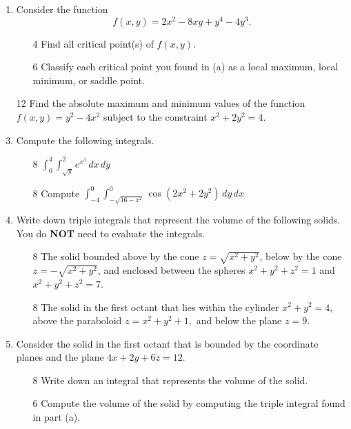 \documentclass[addpoints,12pt]{exam}
\begin{document}
\begin{enumerate}
\newpage
\item Consider the function
$$f(x,y) = 2x^2 -8xy +y^4 -4y^3.$$
%
%
\begin{itemize}
\item[4]
Find all critical point(s) of $f(x,y)$.
\vfill
\vfill
\item[6]
Classify each critical point you found in (a) as a local maximum, local minimum, or saddle point.
\vfill
\vfill
\vfill
\end{itemize}
\newpage
\item[12] Find the absolute maximum and minimum values of the function $f(x,y)=
y^2-4x^2$ subject to the constraint $x^2+2y^2=4$.
\newpage
\item Compute the following integrals.
\begin{itemize}
\item[8] $\displaystyle\int_0^{4}\int_{\sqrt{y}}^{2} e^{x^3}\, dx\, dy$
\vfill
\item[8] Compute $\displaystyle\int_{-4}^{0}\int_{-\sqrt{16-x^2}}^{0} \cos(2x^2+2y^2) \, dy \, dx$
\vfill
\end{itemize}
\newpage
\item Write down triple integrals that represent the volume of the following solids. You do
\textbf{NOT} need to evaluate the integrals.
\begin{itemize}
\item[8] The solid bounded above by the cone $z = \sqrt{x^2 + y^2}$, below by the cone \\ $z =
-\sqrt{x^2 + y^2}$, and enclosed between the spheres $x^2 + y^2 + z^2 = 1$ and $x^2 + y^2 +
z^2 = 7$.
\vfill
\item[8] The solid in the first octant that lies within the cylinder $x^2+y^2 =4,$ above the
paraboloid $z = x^2+y^2 +1,$ and below the plane $z = 9.$
\vfill
\end{itemize}
\newpage
\item Consider the solid in the first octant that is bounded by the coordinate planes and the
plane $4x+2y+6z=12.$
\begin{itemize}
\item[8] Write down an integral that represents the volume of the solid.
\vfill
\item[6] Compute the volume of the solid by computing the triple integral found in part (a).
\vfill
\vfill
\vfill
\end{itemize}
\newpage
\end{enumerate}
\end{document}
